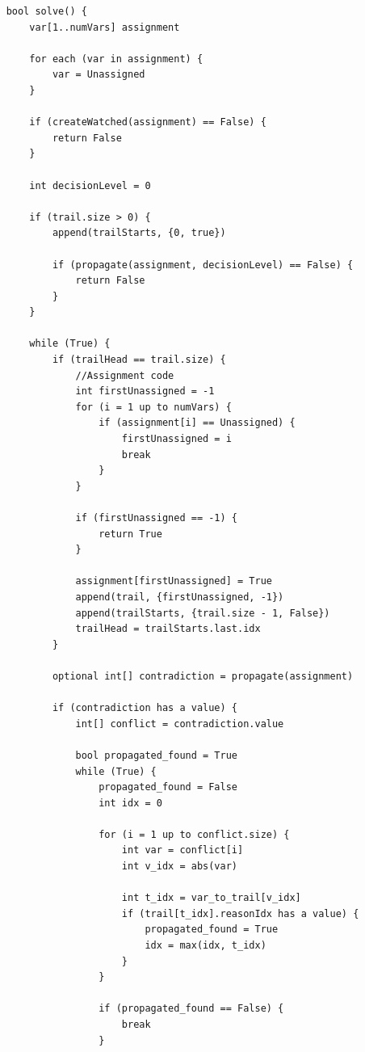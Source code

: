 \documentclass[oneside]{book}
\begin{document}
\begin{lstlisting}
    bool solve() {
        var[1..numVars] assignment

        for each (var in assignment) {
            var = Unassigned
        }

        if (createWatched(assignment) == False) {
            return False
        }

        int decisionLevel = 0

        if (trail.size > 0) {
            append(trailStarts, {0, true})

            if (propagate(assignment, decisionLevel) == False) {
                return False
            }
        }

        while (True) {
            if (trailHead == trail.size) {
                //Assignment code
                int firstUnassigned = -1
                for (i = 1 up to numVars) {
                    if (assignment[i] == Unassigned) {
                        firstUnassigned = i
                        break
                    }
                }

                if (firstUnassigned == -1) {
                    return True
                }

                assignment[firstUnassigned] = True
                append(trail, {firstUnassigned, -1})
                append(trailStarts, {trail.size - 1, False})
                trailHead = trailStarts.last.idx
            }

            optional int[] contradiction = propagate(assignment)

            if (contradiction has a value) {
                int[] conflict = contradiction.value

                bool propagated_found = True
                while (True) {
                    propagated_found = False
                    int idx = 0

                    for (i = 1 up to conflict.size) {
                        int var = conflict[i]
                        int v_idx = abs(var)

                        int t_idx = var_to_trail[v_idx]
                        if (trail[t_idx].reasonIdx has a value) {
                            propagated_found = True
                            idx = max(idx, t_idx)
                        }
                    }

                    if (propagated_found == False) {
                        break
                    }


\end{lstlisting}
\end{document}
